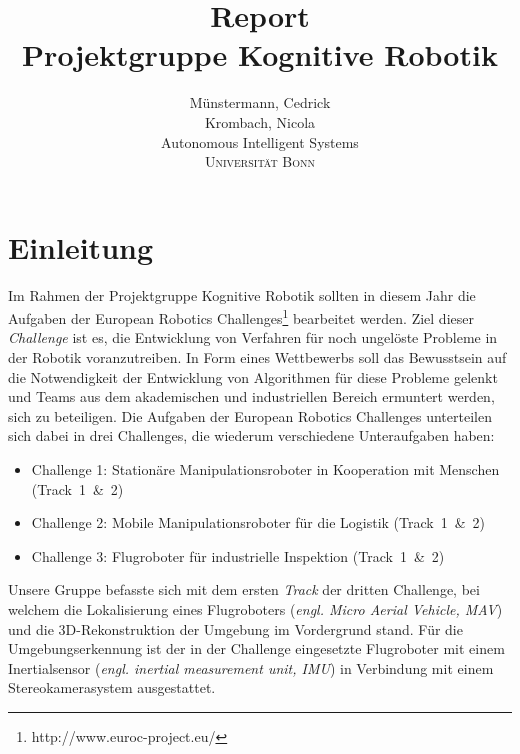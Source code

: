 \documentclass[12pt,titlepage, a4paper]{article}
\begin{document}
\title{Report\vspace{1cm}\\\textbf{Projektgruppe Kognitive Robotik}\vspace{5cm}}


\author{Münstermann,  Cedrick\\  Krombach, Nicola\\[1cm]
	Autonomous Intelligent Systems\\ \textsc{Universität Bonn}\\}



\maketitle



\section{Einleitung}

Im Rahmen der Projektgruppe Kognitive Robotik sollten in diesem Jahr die Aufgaben der European Robotics Challenges\footnote{http://www.euroc-project.eu/} bearbeitet werden.
Ziel dieser \textit{Challenge} ist es, die Entwicklung von Verfahren für noch ungelöste Probleme in der Robotik voranzutreiben.
In Form eines Wettbewerbs soll das Bewusstsein auf die Notwendigkeit der Entwicklung von Algorithmen für diese Probleme gelenkt und Teams aus dem akademischen und industriellen Bereich ermuntert werden, sich zu beteiligen.
Die Aufgaben der European Robotics Challenges unterteilen sich dabei in drei Challenges, die wiederum verschiedene Unteraufgaben haben:

\begin{itemize}
 \item Challenge 1: Stationäre Manipulationsroboter in Kooperation mit Menschen \mbox{(Track 1 \& 2)}
 \item Challenge 2: Mobile Manipulationsroboter für die Logistik \mbox{(Track 1 \& 2)}
 \item Challenge 3: Flugroboter für industrielle Inspektion \mbox{(Track 1 \& 2)}
\end{itemize}

Unsere Gruppe befasste sich mit dem ersten \textit{Track} der dritten Challenge, bei welchem die Lokalisierung eines Flugroboters (\textit{engl. Micro Aerial Vehicle, MAV}) und die 3D-Rekonstruktion 
der Umgebung im Vordergrund stand.
Für die Umgebungserkennung ist der in der Challenge eingesetzte Flugroboter mit einem Inertialsensor (\textit{engl. inertial measurement unit, IMU}) in Verbindung mit einem Stereokamerasystem ausgestattet. 
\end{document}
